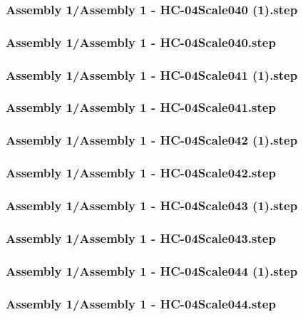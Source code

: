 \documentclass[a4paper,12pt]{article}
\begin{document}
\begin{lstlising}[language=C++]
\subsubsection{Assembly 1/Assembly 1 - HC-04Scale040 (1).step}

\subsubsection{Assembly 1/Assembly 1 - HC-04Scale040.step}

\subsubsection{Assembly 1/Assembly 1 - HC-04Scale041 (1).step}

\subsubsection{Assembly 1/Assembly 1 - HC-04Scale041.step}

\subsubsection{Assembly 1/Assembly 1 - HC-04Scale042 (1).step}

\subsubsection{Assembly 1/Assembly 1 - HC-04Scale042.step}

\subsubsection{Assembly 1/Assembly 1 - HC-04Scale043 (1).step}

\subsubsection{Assembly 1/Assembly 1 - HC-04Scale043.step}

\subsubsection{Assembly 1/Assembly 1 - HC-04Scale044 (1).step}

\subsubsection{Assembly 1/Assembly 1 - HC-04Scale044.step}


\end{lstlising}
\end{document}
